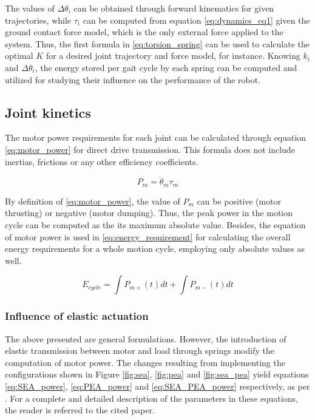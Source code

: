 The values of $\Delta \theta_{i}$ can be obtained through forward kinematics for given trajectories, while $\tau_{i}$ can be computed from equation \ref{eq:dynamics_eq1} given the ground contact force model, which is the only external force applied to the system.
Thus, the first formula in \ref{eq:torsion_spring} can be used to calculate the optimal $K$ for a desired joint trajectory and force model, for instance.
Knowing $k_{i}$ and $\Delta \theta_{i}$, the energy stored per gait cycle by each spring can be computed and utilized for studying their influence on the performance of the robot.

\subsection{Joint kinetics} %
\label{sec:joint_kinetics}
The motor power requirements for each joint can be calculated through equation \ref{eq:motor_power} for direct drive transmission.
This formula does not include inertias, frictions or any other efficiency coefficients. 

\begin{equation}
\label{eq:motor_power}
	P_{m} = \dot{\theta}_{m} \tau_{m}
\end{equation}

By definition of \ref{eq:motor_power}, the value of $P_{m}$ can be positive (motor thrusting) or negative (motor dumping).
Thus, the peak power in the motion cycle can be computed as the its maximum absolute value.
Besides, the equation of motor power is used in \ref{eq:energy_requirement} for calculating the overall energy requirements for a whole motion cycle, employing only absolute values as well.

\begin{equation}
\label{eq:energy_requirement}
 	E_{cycle} = \int{P_{m+}(t) dt} + \int{P_{m-}(t) dt}
 \end{equation} 

\subsubsection{Influence of elastic actuation} %
\label{sub:influence_of_elastic_actuation}
The above presented are general formulations.
However, the introduction of elastic transmission between motor and load through springs modify the computation of motor power.
The changes resulting from implementing the configurations shown in Figure \ref{fig:sea}, \ref{fig:pea} and \ref{fig:sea_pea} yield equations \ref{eq:SEA_power}, \ref{eq:PEA_power} and \ref{eq:SEA_PEA_power} respectively, as per \cite{grimmer}.
For a complete and detailed description of the parameters in these equations, the reader is referred to the cited paper.

